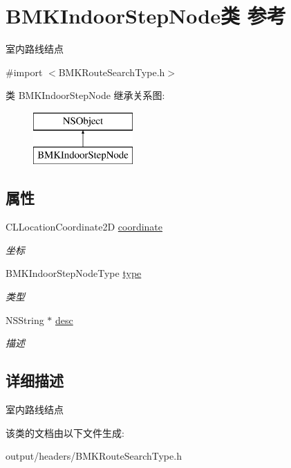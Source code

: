 \hypertarget{interface_b_m_k_indoor_step_node}{}\section{B\+M\+K\+Indoor\+Step\+Node类 参考}
\label{interface_b_m_k_indoor_step_node}


室内路线结点  




{\ttfamily \#import $<$B\+M\+K\+Route\+Search\+Type.\+h$>$}

类 B\+M\+K\+Indoor\+Step\+Node 继承关系图\+:\begin{figure}[H]
\begin{center}
\leavevmode
\includegraphics[height=2.000000cm]{interface_b_m_k_indoor_step_node}
\end{center}
\end{figure}
\subsection*{属性}
\begin{DoxyCompactItemize}
\item 
\hypertarget{interface_b_m_k_indoor_step_node_a35b7fba245e02474addd6eaad473b7f5}{}C\+L\+Location\+Coordinate2\+D \hyperlink{interface_b_m_k_indoor_step_node_a35b7fba245e02474addd6eaad473b7f5}{coordinate}\label{interface_b_m_k_indoor_step_node_a35b7fba245e02474addd6eaad473b7f5}

\begin{DoxyCompactList}\small\item\em 坐标 \end{DoxyCompactList}\item 
\hypertarget{interface_b_m_k_indoor_step_node_aa347075bde64a982b7ef97549edb6d42}{}B\+M\+K\+Indoor\+Step\+Node\+Type \hyperlink{interface_b_m_k_indoor_step_node_aa347075bde64a982b7ef97549edb6d42}{type}\label{interface_b_m_k_indoor_step_node_aa347075bde64a982b7ef97549edb6d42}

\begin{DoxyCompactList}\small\item\em 类型 \end{DoxyCompactList}\item 
\hypertarget{interface_b_m_k_indoor_step_node_a51052d7aaea47ef6ff2e6e54f4729a9e}{}N\+S\+String $\ast$ \hyperlink{interface_b_m_k_indoor_step_node_a51052d7aaea47ef6ff2e6e54f4729a9e}{desc}\label{interface_b_m_k_indoor_step_node_a51052d7aaea47ef6ff2e6e54f4729a9e}

\begin{DoxyCompactList}\small\item\em 描述 \end{DoxyCompactList}\end{DoxyCompactItemize}


\subsection{详细描述}
室内路线结点 

该类的文档由以下文件生成\+:\begin{DoxyCompactItemize}
\item 
output/headers/B\+M\+K\+Route\+Search\+Type.\+h\end{DoxyCompactItemize}
